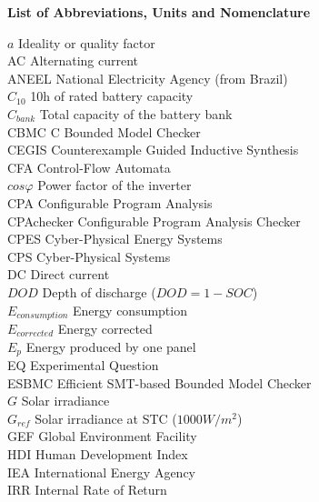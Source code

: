 \thispagestyle{plain}
\begin{center}
%    
%    
%    
    \vspace{0.9cm}
    \textbf{List of Abbreviations, Units and Nomenclature}
\end{center}

\noindent $a$ Ideality or quality factor \\
AC Alternating current \\
ANEEL National Electricity Agency (from Brazil) \\
$C_{10}$ 10h of rated battery capacity \\
$C_{bank}$ Total capacity of the battery bank \\
CBMC C Bounded Model Checker \\
CEGIS Counterexample Guided Inductive Synthesis \\
CFA Control-Flow Automata \\
$ cos \varphi $ Power factor of the inverter \\
CPA Configurable Program Analysis \\
CPAchecker Configurable Program Analysis Checker \\
CPES Cyber-Physical Energy Systems \\
CPS Cyber-Physical Systems \\
DC Direct current \\
$DOD$ Depth of discharge ($DOD=1-SOC$) \\
$E_{consumption}$ Energy consumption \\
$E_{corrected}$ Energy corrected \\
$E_{p}$ Energy produced by one panel \\
EQ Experimental Question \\
ESBMC Efficient SMT-based Bounded Model Checker \\
$G$ Solar irradiance \\
$ G_{ref} $ Solar irradiance at STC ($1000 W/m^{2}$) \\
GEF Global Environment Facility \\
HDI Human Development Index \\
IEA International Energy Agency \\
IRR  Internal Rate of Return \\
